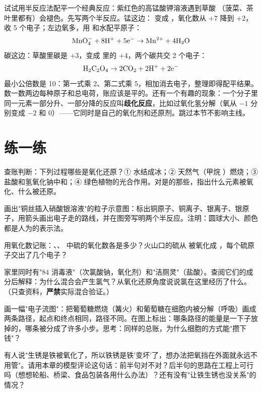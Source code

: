 \begin{tiaozhan}
试试用半反应法配平一个经典反应：紫红色的高锰酸钾溶液遇到草酸 （菠菜、茶叶里都有）会褪色。先写两个半反应。锰这边： 变成 ，氧化数从 $+7$ 降到 $+2$，收 5 个电子；左边氧多，用  和水配平原子：\[\mathrm{MnO_4^-} + \mathrm{8H^+} + \mathrm{5e^-} \rightarrow \mathrm{Mn^{2+}} + \mathrm{4H_2O}\]碳这边：草酸里碳是 $+3$，变成  里的 $+4$，两个碳共交 2 个电子：\[\mathrm{H_2C_2O_4} \rightarrow \mathrm{2CO_2} + \mathrm{2H^+} + \mathrm{2e^-}\]最小公倍数是 10：第一式乘 2、第二式乘 5，相加消去电子，整理即得配平结果。数一数两边每种原子和总电荷，账应该是平的。还有一个有趣的现象：一个分子里同一元素一部分升、一部分降的反应叫\textbf{歧化反应}，比如过氧化氢分解（氧从 $-1$ 分别变成 $-2$ 和 0）——它同时是自己的氧化剂和还原剂。跳过本节不影响主线。
\end{tiaozhan}

\section*{练一练}

\begin{sikaoti}
\item 查账判断：下列过程哪些是氧化还原？① 水结成冰；② 天然气（甲烷 ）燃烧；③ 盐酸和氢氧化钠中和；④ 绿色植物的光合作用。对是的那些，指出什么元素被氧化、什么被还原。
\item 画出"铜丝插入硝酸银溶液"的粒子示意图：标出铜原子、铜离子、银离子、银原子，用箭头画出电子走的路线，并在图旁写明两个半反应。注明：圆球大小、颜色都是人为的表示法。
\item 用氧化数记账：、、 中硫的氧化数各是多少？火山口的硫从  被氧化成 ，每个硫原子交出了几个电子？
\item 家里同时有"84 消毒液"（次氯酸钠，氧化剂）和"洁厕灵"（盐酸）。查阅它们的成分后解释：为什么混合会产生氯气？从氧化还原角度说说氯在这里经历了什么。（只查资料，\textbf{严禁}实际混合验证。）
\item 画一幅"电子流图"：把葡萄糖燃烧（篝火）和葡萄糖在细胞内被分解（呼吸）画成两条路径，起点和终点相同，路径不同。在图上标出：哪条路径的能量是一下子放掉的，哪条被分成了许多小步。思考：同样的总账，为什么细胞的方式能"攒下钱"？
\item 有人说"生锈是铁被氧化了，所以铁锈是铁'变坏'了，想办法把氧挡在外面就永远不用管"。请用本章的模型评论这句话：前半句对不对？后半句的思路在工程上可行吗（想想轮船、桥梁、食品包装各用什么办法）？还有没有"让铁生锈也没关系"的情况？
\end{sikaoti}
